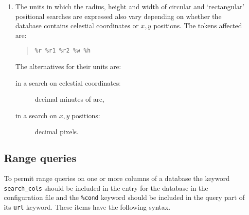 \documentclass[twoside,11pt,nolof,chapters]{starlink}
\begin{document}
\begin{enumerate}
  \item The units in which the radius, height and width of circular and
   `rectangular' positional searches are expressed also vary depending
   on whether the database contains celestial coordinates or $x,y$\/
   positions.  The tokens affected are:

  \begin{quote}
   \texttt{\%r \%r1 \%r2 \%w \%h}
  \end{quote}

   The alternatives for their units are:

  \begin{description}

    \item[in a search on celestial coordinates:] decimal minutes of arc,

    \item[in a search on $x,y$\/ positions:] decimal pixels.

  \end{description}

\end{enumerate}

\subsection{\label{RANGE_R}Range queries}

To permit range queries on one or more columns of a database the keyword
\texttt{search\_cols} should be included in the entry for the database in
the configuration file and the \texttt{\%cond} keyword should be included
in the query part of its \texttt{url} keyword.  These items have the
following syntax.
\end{document}
